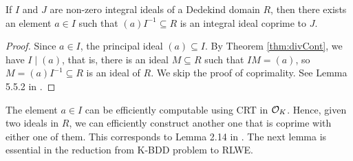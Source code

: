 \documentclass[../main.tex]{subfiles}
\begin{document}
\begin{lemma}
\label{lm:coprimeIdeals}
If $I$ and $J$ are non-zero integral ideals of a Dedekind domain $R$, then there exists an element $a \in I$ such that $(a)I^{-1} \subseteq R$ is an integral ideal coprime to $J$. 
\end{lemma}
\begin{proof}
Since $a \in I$, the principal ideal $(a) \subseteq I$. By Theorem \ref{thm:divCont}, we have $I \mid (a)$, that is, there is an ideal $M \subseteq R$ such that $IM=(a)$, so $M=(a)I^{-1} \subseteq R$ is an ideal of $R$. We skip the proof of coprimality. %
See Lemma 5.5.2 in \cite{stein2012algebraic}.
\end{proof}

The element $a \in I$ can be efficiently computable using CRT in $\mathcal{O}_K$. Hence, given two ideals in $R$, we can efficiently construct another one that is coprime with either one of them. This corresponds to Lemma 2.14 in \cite{lyubashevsky2010ideal}. The next lemma is essential in the reduction from K-BDD problem to RLWE. 
\end{document}

